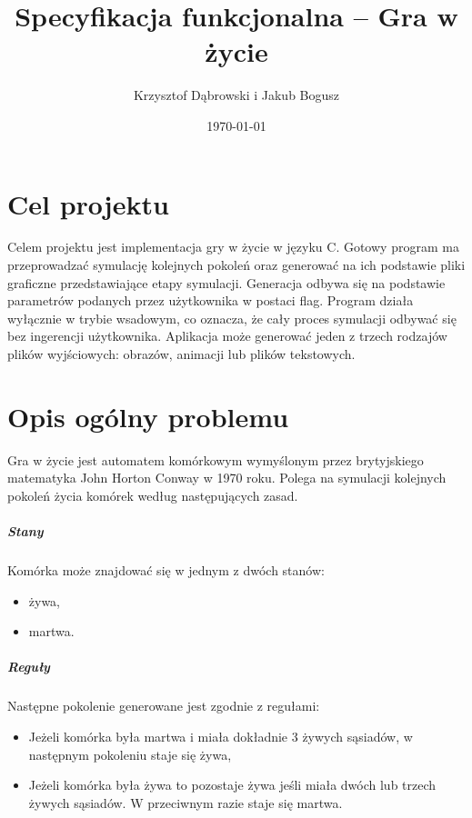 \documentclass{report}
\title{Specyfikacja funkcjonalna -- Gra w życie}
\author{Krzysztof Dąbrowski i Jakub Bogusz}
\date{\today}
\begin{document}
\maketitle{}

\tableofcontents{}

\chapter{Cel projektu}
Celem projektu jest implementacja gry w życie w języku C. Gotowy program ma przeprowadzać symulację kolejnych pokoleń oraz generować na ich podstawie pliki graficzne przedstawiające etapy symulacji. Generacja odbywa się na podstawie parametrów podanych przez użytkownika w postaci flag. Program działa wyłącznie w trybie wsadowym, co oznacza, że cały proces symulacji odbywać się bez ingerencji użytkownika. Aplikacja może generować jeden z trzech rodzajów plików wyjściowych: obrazów, animacji lub plików tekstowych.

\chapter{Opis ogólny problemu}
Gra w życie jest automatem komórkowym wymyślonym przez brytyjskiego matematyka John Horton Conway
w 1970 roku. Polega na symulacji kolejnych pokoleń życia komórek według następujących zasad.

\paragraph{Stany}  Komórka może znajdować się w jednym z dwóch stanów:
\begin{itemize}
\item żywa,
\item martwa.
\end{itemize}

\paragraph{Reguły} Następne pokolenie generowane jest zgodnie z regułami:
\begin{itemize}
\item Jeżeli komórka była martwa i miała dokładnie 3 żywych sąsiadów, w następnym pokoleniu staje się żywa,
\item Jeżeli komórka była żywa to pozostaje żywa jeśli miała dwóch lub trzech żywych sąsiadów. W przeciwnym razie staje się martwa.
\end{itemize}
\end{document}
